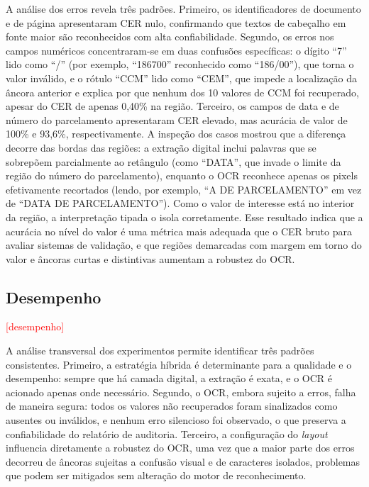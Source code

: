 \documentclass[article,12pt,oneside,a4paper,english,brazil]{abntex2}
\newcommand{\pendente}[1]{\textcolor{red}{#1}}
\newcommand{\RESULTADOSDESEMPENHO}{\pendente{[desempenho]}}
\begin{document}
A análise dos erros revela três padrões. Primeiro, os identificadores de documento e de
página apresentaram CER nulo, confirmando que textos de cabeçalho em fonte maior são
reconhecidos com alta confiabilidade. Segundo, os erros nos campos numéricos
concentraram-se em duas confusões específicas: o dígito ``7'' lido como ``/'' (por
exemplo, ``186700'' reconhecido como ``186/00''), que torna o valor inválido, e o rótulo
``CCM'' lido como ``CEM'', que impede a localização da âncora anterior e explica por que
nenhum dos 10 valores de CCM foi recuperado, apesar do CER de apenas 0,40\% na região.
Terceiro, os campos de data e de número do parcelamento apresentaram CER elevado, mas
acurácia de valor de 100\% e 93,6\%, respectivamente. A inspeção dos casos mostrou que a
diferença decorre das bordas das regiões: a extração digital inclui palavras que se
sobrepõem parcialmente ao retângulo (como ``DATA'', que invade o limite da região do
número do parcelamento), enquanto o OCR reconhece apenas os pixels efetivamente
recortados (lendo, por exemplo, ``A DE PARCELAMENTO'' em vez de ``DATA DE
PARCELAMENTO''). Como o valor de interesse está no interior da região, a interpretação
tipada o isola corretamente. Esse resultado indica que a acurácia no nível do valor é
uma métrica mais adequada que o CER bruto para avaliar sistemas de validação, e que
regiões demarcadas com margem em torno do valor e âncoras curtas e distintivas
aumentam a robustez do OCR.

\subsection{Desempenho}

\RESULTADOSDESEMPENHO

A análise transversal dos experimentos permite identificar três padrões consistentes.
Primeiro, a estratégia híbrida é determinante para a qualidade e o desempenho: sempre
que há camada digital, a extração é exata, e o OCR é acionado apenas onde necessário.
Segundo, o OCR, embora sujeito a erros, falha de maneira segura: todos os valores não
recuperados foram sinalizados como ausentes ou inválidos, e nenhum erro silencioso foi
observado, o que preserva a confiabilidade do relatório de auditoria. Terceiro, a
configuração do \textit{layout} influencia diretamente a robustez do OCR, uma vez que a
maior parte dos erros decorreu de âncoras sujeitas a confusão visual e de caracteres
isolados, problemas que podem ser mitigados sem alteração do motor de reconhecimento.
\end{document}

